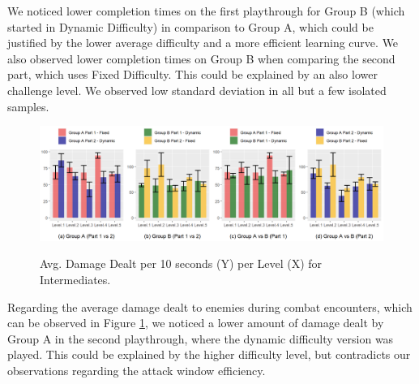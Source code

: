 We noticed lower completion times on the first playthrough for Group B (which started in Dynamic Difficulty) in comparison to Group A, which could be justified by the lower average difficulty and a more efficient learning curve. We also observed lower completion times on Group B when comparing the second part, which uses Fixed Difficulty. This could be explained by an also lower challenge level. We observed low standard deviation in all but a few isolated samples.

\begin{figure}[!ht]
    \begin{center}
    \caption{Avg. Damage Dealt per 10 seconds (Y) per Level (X) for Intermediates.}
        \includegraphics[width=\textwidth]{figures/damage_dealt_per_10s-intermediate_players.png}
        \label{fig:result-metric-intermediates-damage-dealt-per-10s}
    \end{center}
\end{figure}

Regarding the average damage dealt to enemies during combat encounters, which can be observed in Figure \ref{fig:result-metric-intermediates-damage-dealt-per-10s}, we noticed a lower amount of damage dealt by Group A in the second playthrough, where the dynamic difficulty version was played. This could be explained by the higher difficulty level, but contradicts our observations regarding the attack window efficiency.

